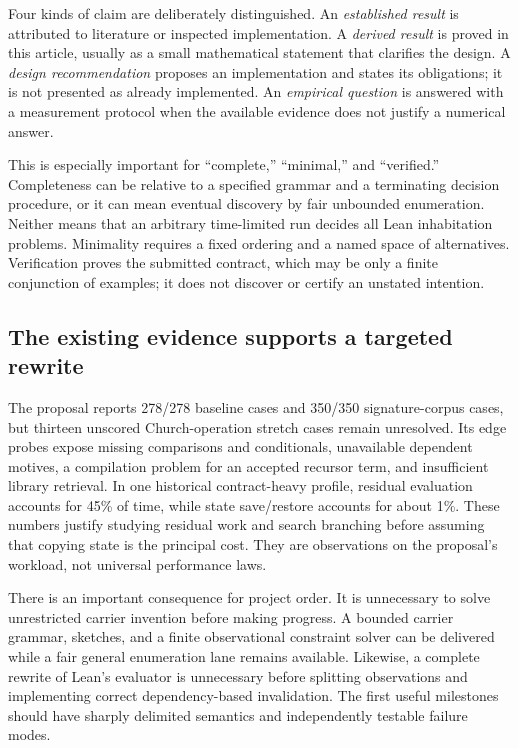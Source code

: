Four kinds of claim are deliberately distinguished. An \emph{established result} is attributed to literature or inspected implementation. A \emph{derived result} is proved in this article, usually as a small mathematical statement that clarifies the design. A \emph{design recommendation} proposes an implementation and states its obligations; it is not presented as already implemented. An \emph{empirical question} is answered with a measurement protocol when the available evidence does not justify a numerical answer.

This is especially important for ``complete,'' ``minimal,'' and ``verified.'' Completeness can be relative to a specified grammar and a terminating decision procedure, or it can mean eventual discovery by fair unbounded enumeration. Neither means that an arbitrary time-limited run decides all Lean inhabitation problems. Minimality requires a fixed ordering and a named space of alternatives. Verification proves the submitted contract, which may be only a finite conjunction of examples; it does not discover or certify an unstated intention.

\subsection{The existing evidence supports a targeted rewrite}

The proposal reports 278/278 baseline cases and 350/350 signature-corpus cases, but thirteen unscored Church-operation stretch cases remain unresolved. Its edge probes expose missing comparisons and conditionals, unavailable dependent motives, a compilation problem for an accepted recursor term, and insufficient library retrieval. In one historical contract-heavy profile, residual evaluation accounts for 45\% of time, while state save/restore accounts for about 1\%. These numbers justify studying residual work and search branching before assuming that copying state is the principal cost. They are observations on the proposal's workload, not universal performance laws.\cite{evidence}

There is an important consequence for project order. It is unnecessary to solve unrestricted carrier invention before making progress. A bounded carrier grammar, sketches, and a finite observational constraint solver can be delivered while a fair general enumeration lane remains available. Likewise, a complete rewrite of Lean's evaluator is unnecessary before splitting observations and implementing correct dependency-based invalidation. The first useful milestones should have sharply delimited semantics and independently testable failure modes.

